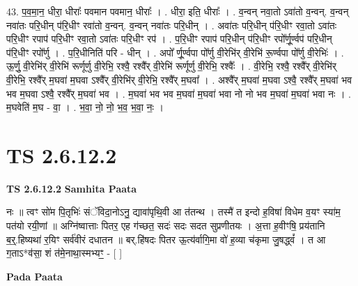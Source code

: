 \documentclass[17pt]{extarticle}
\begin{document}
43. प॒व॒मा॒न॒ धीरा॒ धीराः᳚ पवमान पवमान॒ धीराः᳚ । . धीरा॒ इति॒ धीराः᳚ । . व॒न्वन् नवा॒तो ऽवा॑तो व॒न्वन्. व॒न्वन् नवा॑तः परि॒धीन् प॑रि॒धीꣳ रवा॑तो व॒न्वन्. व॒न्वन् नवा॑तः परि॒धीन् । . अवा॑तः परि॒धीन् प॑रि॒धीꣳ रवा॒तो ऽवा॑तः परि॒धीꣳ रपाप॑ परि॒धीꣳ रवा॒तो ऽवा॑तः परि॒धीꣳ रप॑ । . प॒रि॒धीꣳ रपाप॑ परि॒धीन् प॑रि॒धीꣳ रपो᳚र्णू॒र्ण्वप॑ परि॒धीन् प॑रि॒धीꣳ रपो᳚र्णु । . प॒रि॒धीनिति॑ परि - धीन् । . अपो᳚ र्णू॒र्ण्वपा पो᳚र्णु वी॒रेभि॑र् वी॒रेभि॑ रू॒र्ण्वपा पो᳚र्णु वी॒रेभिः॑ । . ऊ॒र्णु॒ वी॒रेभि॑र् वी॒रेभि॑ रूर्णूर्णु वी॒रेभि॒ रश्वै॒ रश्वै᳚र् वी॒रेभि॑ रूर्णूर्णु वी॒रेभि॒ रश्वैः᳚ । . वी॒रेभि॒ रश्वै॒ रश्वै᳚र् वी॒रेभि॑र् वी॒रेभि॒ रश्वै᳚र् म॒घवा॑ म॒घवा ऽश्वै᳚र् वी॒रेभि॑र् वी॒रेभि॒ रश्वै᳚र् म॒घवा᳚ । . अश्वै᳚र् म॒घवा॑ म॒घवा ऽश्वै॒ रश्वै᳚र् म॒घवा॑ भव भव म॒घवा ऽश्वै॒ रश्वै᳚र् म॒घवा॑ भव । . म॒घवा॑ भव भव म॒घवा॑ म॒घवा॑ भवा नो नो भव म॒घवा॑ म॒घवा॑ भवा नः । . म॒घवेति॑ म॒घ - वा॒ । . भ॒वा॒ नो॒ नो॒ भ॒व॒ भ॒वा॒ नः॒ । \newline
\pagebreak
{}

\section{ TS 2.6.12.2 }

\textbf{TS 2.6.12.2 } \newline
\textbf{Samhita Paata} \newline

नः ॥ त्वꣳ सो॑म पि॒तृभिः॑ संॅविदा॒नोऽनु॒ द्यावा॑पृथि॒वी आ त॑तन्थ । तस्मै॑ त इन्दो ह॒विषा॑ विधेम व॒यꣳ स्या॑म॒ पत॑यो रयी॒णां ॥ अग्नि॑ष्वात्ताः पितर॒ एह ग॑च्छत॒ सदः॑ सदः सदत सुप्रणीतयः । अ॒त्ता ह॒वीꣳषि॒ प्रय॑तानि ब॒र्॒.हिष्यथा॑ र॒यिꣳ सर्व॑वीरं दधातन ॥ बर्.हि॑षदः पितर ऊ॒त्य॑र्वागि॒मा वो॑ ह॒व्या च॑कृमा जु॒षद्ध्वं᳚ । त आ ग॒ताऽ*व॑सा॒ शं त॑मे॒नाथा॒स्मभ्यꣳ॒॒ - [  ] \newline

\textbf{Pada Paata} \newline
\end{document}
